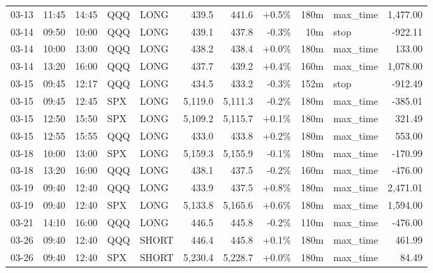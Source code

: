 \documentclass[11pt,a4paper,twoside]{article}
\begin{document}
\begin{center}
\begin{longtable}{>{\color{txtmain}}l l l l l r r r r >{\color{txtmain}}l r}
03-13 & 11:45 & 14:45 & QQQ & LONG & 439.5 & 441.6 & \textcolor{wingreen}{+0.5\%} & 180m & max\_time & \textcolor{wingreen}{1,477.00} \\
03-14 & 09:50 & 10:00 & QQQ & LONG & 439.1 & 437.8 & \textcolor{lossred}{-0.3\%} & 10m & stop & \textcolor{lossred}{-922.11} \\
03-14 & 10:00 & 13:00 & QQQ & LONG & 438.2 & 438.4 & \textcolor{wingreen}{+0.0\%} & 180m & max\_time & \textcolor{wingreen}{133.00} \\
03-14 & 13:20 & 16:00 & QQQ & LONG & 437.7 & 439.2 & \textcolor{wingreen}{+0.4\%} & 160m & max\_time & \textcolor{wingreen}{1,078.00} \\
03-15 & 09:45 & 12:17 & QQQ & LONG & 434.5 & 433.2 & \textcolor{lossred}{-0.3\%} & 152m & stop & \textcolor{lossred}{-912.49} \\
03-15 & 09:45 & 12:45 & SPX & LONG & 5,119.0 & 5,111.3 & \textcolor{lossred}{-0.2\%} & 180m & max\_time & \textcolor{lossred}{-385.01} \\
03-15 & 12:50 & 15:50 & SPX & LONG & 5,109.2 & 5,115.7 & \textcolor{wingreen}{+0.1\%} & 180m & max\_time & \textcolor{wingreen}{321.49} \\
03-15 & 12:55 & 15:55 & QQQ & LONG & 433.0 & 433.8 & \textcolor{wingreen}{+0.2\%} & 180m & max\_time & \textcolor{wingreen}{553.00} \\
03-18 & 10:00 & 13:00 & SPX & LONG & 5,159.3 & 5,155.9 & \textcolor{lossred}{-0.1\%} & 180m & max\_time & \textcolor{lossred}{-170.99} \\
03-18 & 13:20 & 16:00 & QQQ & LONG & 438.1 & 437.5 & \textcolor{lossred}{-0.2\%} & 160m & max\_time & \textcolor{lossred}{-476.00} \\
03-19 & 09:40 & 12:40 & QQQ & LONG & 433.9 & 437.5 & \textcolor{wingreen}{+0.8\%} & 180m & max\_time & \textcolor{wingreen}{2,471.01} \\
03-19 & 09:40 & 12:40 & SPX & LONG & 5,133.8 & 5,165.6 & \textcolor{wingreen}{+0.6\%} & 180m & max\_time & \textcolor{wingreen}{1,594.00} \\
03-21 & 14:10 & 16:00 & QQQ & LONG & 446.5 & 445.8 & \textcolor{lossred}{-0.2\%} & 110m & max\_time & \textcolor{lossred}{-476.00} \\
03-26 & 09:40 & 12:40 & QQQ & SHORT & 446.4 & 445.8 & \textcolor{wingreen}{+0.1\%} & 180m & max\_time & \textcolor{wingreen}{461.99} \\
03-26 & 09:40 & 12:40 & SPX & SHORT & 5,230.4 & 5,228.7 & \textcolor{wingreen}{+0.0\%} & 180m & max\_time & \textcolor{wingreen}{84.49} \\

\end{longtable}
\end{center}
\end{document}
